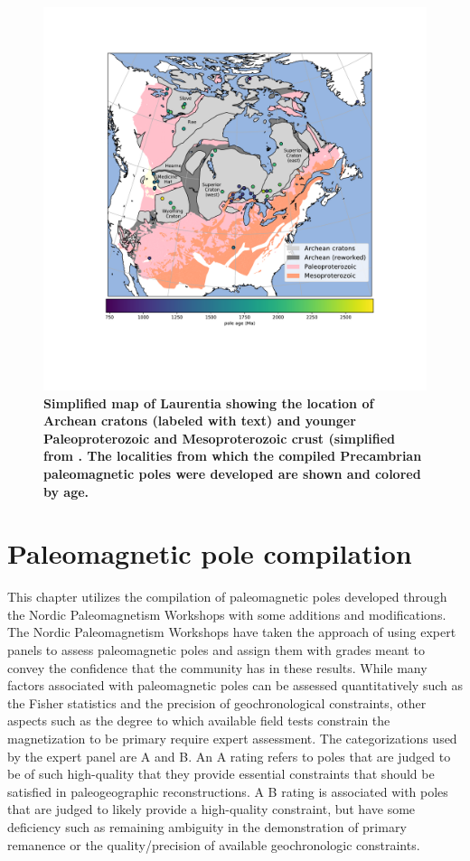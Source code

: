 \documentclass[11pt,letterpaper]{article}
\begin{document}
\begin{figure}
\centering
\includegraphics[width=6.5 in]{Figures/Fig1_map.pdf}
\caption{\small{\textbf{Simplified map of Laurentia showing the location of Archean cratons (labeled with text) and younger Paleoproterozoic and Mesoproterozoic crust (simplified from \cite{Whitmeyer2007a}. The localities from which the compiled Precambrian paleomagnetic poles were developed are shown and colored by age.}}}
\label{fig:Laurentia_map}
\end{figure}

\section{Paleomagnetic pole compilation}

This chapter utilizes the compilation of paleomagnetic poles developed through the Nordic Paleomagnetism Workshops with some additions and modifications. The Nordic Paleomagnetism Workshops have taken the approach of using expert panels to assess paleomagnetic poles and assign them with grades meant to convey the confidence that the community has in these results. While many factors associated with paleomagnetic poles can be assessed quantitatively such as the Fisher statistics and the precision of geochronological constraints, other aspects such as the degree to which available field tests constrain the magnetization to be primary require expert assessment. The categorizations used by the expert panel are A and B. An A rating refers to poles that are judged to be of such high-quality that they provide essential constraints that should be satisfied in paleogeographic reconstructions. A B rating is associated with poles that are judged to likely provide a high-quality constraint, but have some deficiency such as remaining ambiguity in the demonstration of primary remanence or the quality/precision of available geochronologic constraints.
\end{document}
